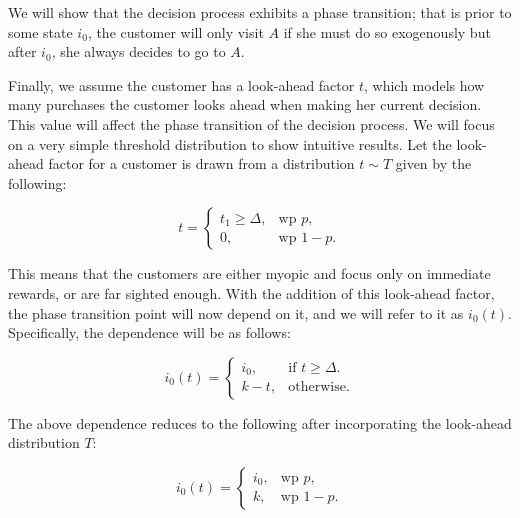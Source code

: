 We will show that the decision process exhibits a phase transition; that is prior to some state $i_0$, the customer will only visit $A$ if she must do so exogenously but after $i_0$, she always decides to go to $A$. 

Finally, we assume the customer has a look-ahead factor $t$, which models how many purchases the customer looks ahead when making her current decision. 
This value will affect the phase transition of the decision process. 
We will focus on a very simple threshold distribution to show intuitive results. Let the look-ahead factor for a customer is drawn from a distribution $t \sim T$ given by the following:

\begin{equation*}
  t=\begin{cases}
    t_1\geq \Delta, & \text{wp } p,\\
    0, & \text{wp } 1-p.
  \end{cases}
\end{equation*}


This means that the customers are either myopic and focus only on immediate rewards, or are far sighted enough.
With the addition of this look-ahead factor, the phase transition point will now depend on it, and we will refer to it as $i_0(t)$. Specifically, the dependence will be as follows:

\begin{equation*}
  i_0(t)=\begin{cases}
    i_0, & \text{if $t \geq \Delta$}.\\
    k-t, & \text{otherwise}.
  \end{cases}
\end{equation*}

The above dependence reduces to the following after incorporating the look-ahead distribution $T$:

\begin{equation*}
  i_0(t)=\begin{cases}
    i_0, & \text{wp } p,\\
    k, & \text{wp } 1-p.
  \end{cases}
\end{equation*}


